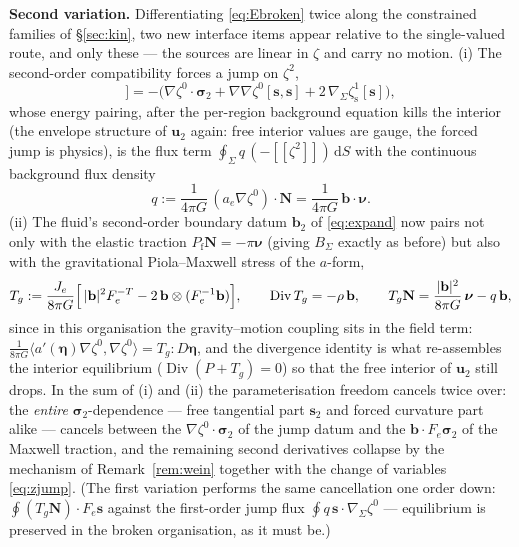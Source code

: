 \documentclass[11pt]{article}
\newcommand{\bnu}{\bm{\nu}}
\newcommand{\bN}{\mathbf{N}}
\newcommand{\bs}{\mathbf{s}}
\newcommand{\jump}[1]{[\![#1]\!]}
\newcommand{\dS}{\,\mathrm{d}S}
\newcommand{\Div}{\operatorname{Div}}
\begin{document}
\textbf{Second variation.} Differentiating \eqref{eq:Ebroken} twice
along the constrained families of \S\ref{sec:kin}, two new interface
items appear relative to the single-valued route, and only these ---
the sources are linear in $\zeta$ and carry no motion. (i) The
second-order compatibility forces a jump on $\zeta^2$,
\begin{equation}
  \jump{\zeta^2}
  = -\bigl( \nabla\zeta^0\cdot\bm{\sigma}_2
          + \nabla\nabla\zeta^0[\bs,\bs]
          + 2\,\nabla_\Sigma\zeta_{\mathrm{s}}^1[\bs] \bigr),
\end{equation}
whose energy pairing, after the per-region background equation kills
the interior (the envelope structure of $\mathbf{u}_2$ again: free
interior values are gauge, the forced jump is physics), is the flux
term $\oint_\Sigma q\,(-\jump{\zeta^2}) \dS$ with the continuous
background flux density
\begin{equation}
  q := \frac{1}{4\pi G}\,(a_e\nabla\zeta^0)\cdot\bN
     = \frac{1}{4\pi G}\,\mathbf{b}\cdot\bnu .
\end{equation}
(ii) The fluid's second-order boundary datum $\mathbf{b}_2$ of
\eqref{eq:expand} now pairs not only with the elastic traction
$P_{\mathrm{f}}\bN = -\pi\bnu$ (giving $B_\Sigma$ exactly as before)
but also with the gravitational Piola--Maxwell stress of the
$a$-form,
\begin{equation}
  T_g := \frac{J_e}{8\pi G}\Bigl[\,|\mathbf{b}|^2 F_e^{-T}
        - 2\,\mathbf{b}\otimes(F_e^{-1}\mathbf{b})\Bigr],
  \qquad
  \Div T_g = -\rho\,\mathbf{b},
  \qquad
  T_g\bN = \frac{|\mathbf{b}|^2}{8\pi G}\,\bnu - q\,\mathbf{b},
\end{equation}
since in this organisation the gravity--motion coupling sits in the
field term: $\tfrac{1}{8\pi G}\langle a'(\bm{\eta})\nabla\zeta^0,
\nabla\zeta^0\rangle = T_g : D\bm{\eta}$, and the divergence identity
is what re-assembles the interior equilibrium ($\Div(P + T_g) = 0$)
so that the free interior of $\mathbf{u}_2$ still drops. In the sum
of (i) and (ii) the parameterisation freedom cancels twice over: the
\emph{entire} $\bm{\sigma}_2$-dependence --- free tangential part
$\bs_2$ and forced curvature part alike --- cancels between the
$\nabla\zeta^0\cdot\bm{\sigma}_2$ of the jump datum and the
$\mathbf{b}\cdot F_e\bm{\sigma}_2$ of the Maxwell traction, and the
remaining second derivatives collapse by the mechanism of
Remark~\ref{rem:wein} together with the change of variables
\eqref{eq:zjump}. (The first variation performs the same
cancellation one order down: $\oint (T_g\bN)\cdot F_e\bs$ against the
first-order jump flux $\oint q\,\bs\cdot\nabla_\Sigma\zeta^0$ ---
equilibrium is preserved in the broken organisation, as it must be.)
\end{document}
